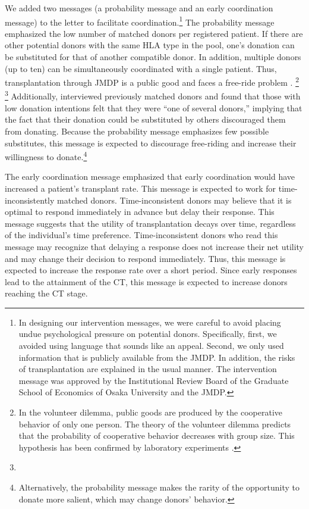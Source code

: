 \documentclass[12pt, a4paper]{article}
\newcommand{\revise}[1]{{\color{red}{#1}}}
\begin{document}
We added two messages (a probability message and an early coordination message) to the letter to facilitate coordination.\footnote{In designing our intervention messages, we were careful to avoid placing undue psychological pressure on potential donors. Specifically, first, we avoided using language that sounds like an appeal. Second, we only used information that is publicly available from the JMDP. In addition, the risks of transplantation are explained in the usual manner. The intervention message was approved by the Institutional Review Board of the Graduate School of Economics of Osaka University and the JMDP.} The probability message emphasized the low number of matched donors per registered patient. If there are other potential donors with the same HLA type in the pool, one's donation can be substituted for that of another compatible donor. In addition, multiple donors (up to ten) can be simultaneously coordinated with a single patient. Thus, transplantation through JMDP is a public good and faces a free-ride problem \citep{Bergstrom2009}. \revise{According to the volunteer dilemma, we can predict that the more common the HLA type, the more reluctant the donor will be to donate.}\footnote{In the volunteer dilemma, public goods are produced by the cooperative behavior of only one person. The theory of the volunteer dilemma predicts that the probability of cooperative behavior decreases with group size. This hypothesis has been confirmed by laboratory experiments \citep{Diekmann1985, Diekmann1986, Goeree2017}.} \footnote{\revise{More specifically, donors do not know their HLA type and make decisions based on how many people have the same HLA type.}} Additionally, \citet{Kurosawa2022} interviewed previously matched donors and found that those with low donation intentions felt that they were ``one of several donors,'' implying that the fact that their donation could be substituted by others discouraged them from donating. Because the probability message emphasizes few possible substitutes, this message is expected to discourage free-riding and increase their willingness to donate.\footnote{Alternatively, the probability message makes the rarity of the opportunity to donate more salient, which may change donors' behavior.}

The early coordination message emphasized that early coordination would have increased a patient's transplant rate. This message is expected to work for time-inconsistently matched donors. Time-inconsistent donors may believe that it is optimal to respond immediately in advance but delay their response. This message suggests that the utility of transplantation decays over time, regardless of the individual's time preference. Time-inconsistent donors who read this message may recognize that delaying a response does not increase their net utility and may change their decision to respond immediately. Thus, this message is expected to increase the response rate over a short period. Since early responses lead to the attainment of the CT, this message is expected to increase donors reaching the CT stage.
\end{document}
